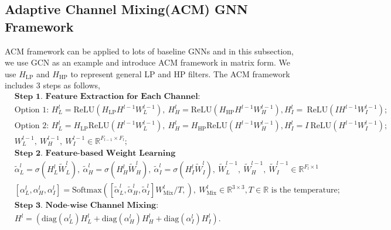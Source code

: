 \documentclass{article}
\newcommand{\0}{{\boldsymbol{0}}}
\newcommand{\6}{{\partial}}
\newcommand{\8}{{\infty}}
\newcommand{\4}{{\nabla}}
\begin{document}
\subsection{Adaptive Channel Mixing(ACM) GNN  Framework}
\label{sec:acm_gnn_architecture}
ACM framework can be applied to lots of baseline GNNs and in this subsection, we use GCN as an example and introduce ACM framework in matrix form. We use $H_\text{LP}$ and $H_\text{HP}$ to represent general LP and HP filters. The ACM framework includes $3$ steps as follows,
\vspace*{-1.5mm}
\begin{equation}
\begin{aligned}
\label{eq:acm_gnn_spectral}
& \textbf{{Step 1. Feature Extraction for Each Channel:}} \\
& \text{Option 1: } {H}^{l}_L = \text{ReLU}\left(H_\text{LP} {H^{l-1}} W^{l-1}_L\right), \ {{H}^{l}_H} =  \text{ReLU}\left(H_\text{HP} {H^{l-1}} W^{l-1}_H\right), {H}^{l}_I  = \ \text{ReLU}\left(I {H^{l-1}} W^{l-1}_I\right); \\
& \text{Option 2: } {H}^{l}_L = H_\text{LP} \text{ReLU}\left({H^{l-1}} W^{l-1}_L\right), \ {{H}^{l}_H} = H_\text{HP} \text{ReLU}\left({H^{l-1}} W^{l-1}_H\right), {H}^{l}_I  = I\ \text{ReLU}\left({H^{l-1}} W^{l-1}_I\right); \\
& W_L^{l-1},\ W_H^{l-1}, \ W_I^{l-1} \in \mathbb{R}^{F_{l-1} \times F_l}; \\
& \textbf{Step 2. Feature-based Weight Learning} \\
&\tilde{\alpha}_L^l = \sigma\left({H}^{l}_L \tilde{W}^{l}_L\right),\ \tilde{\alpha}_H^l = \sigma \left({H}^{l}_H \tilde{W}^{l}_H\right),\ \tilde{\alpha}_I^l = \sigma \left({H}^{l}_I \tilde{W}^{l}_I\right),\ \tilde{W}_L^{l-1},\ \tilde{W}_H^{l-1},\ \tilde{W}_I^{l-1} \in \mathbb{R}^{F_l \times 1}\\ 
& \left[{\alpha}_L^l, {\alpha}_H^l, {\alpha}_I^l \right] = \text{Softmax}\left(\left[\tilde{\alpha}_L^l,\tilde{\alpha}_H^l,\tilde{\alpha}_I^l\right]W_\text{Mix}^l/T, \right),\ W_\text{Mix}^l \in \mathbb{R}^{3\times 3}, T \in \mathbb{R} \text{ is the temperature} ; \\
&\textbf{Step 3. Node-wise Channel Mixing:}\\
& {H^{l}}  = \left( \text{diag}(\alpha_L^l){H}^{l}_L + \text{diag}(\alpha_H^l){H}^{l}_H + \text{diag}(\alpha_I^l){H}^{l}_I \right).
\end{aligned}
\end{equation}
\end{document}

